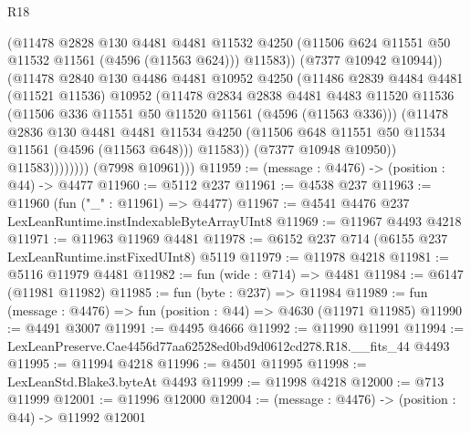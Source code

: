 \begin{lexlean}{R18}
\begin{coremodule}
                          (@11478
                            @2828
                            @130
                            @4481
                            @4481
                            @11532
                            @4250
                            (@11506 @624 @11551 @50 @11532 @11561 (@4596 (@11563 @624)))
                            @11583))
                        (@7377 @10942 @10944))
                      (@11478
                        @2840
                        @130
                        @4486
                        @4481
                        @10952
                        @4250
                        (@11486
                          @2839
                          @4484
                          @4481
                          (@11521 @11536)
                          @10952
                          (@11478
                            @2834
                            @2838
                            @4481
                            @4483
                            @11520
                            @11536
                            (@11506 @336 @11551 @50 @11520 @11561 (@4596 (@11563 @336)))
                            (@11478
                              @2836
                              @130
                              @4481
                              @4481
                              @11534
                              @4250
                              (@11506 @648 @11551 @50 @11534 @11561 (@4596 (@11563 @648)))
                              @11583))
                          (@7377 @10948 @10950))
                        @11583))))))))
        (@7998 @10961)))
@11959 := (message : @4476) -> (position : @44) -> @4477
@11960 := @5112 @237
@11961 := @4538 @237
@11963 := @11960 (fun ("_" : @11961) => @4477)
@11967 := @4541 @4476 @237 LexLeanRuntime.instIndexableByteArrayUInt8
@11969 := @11967 @4493 @4218
@11971 := @11963 @11969 @4481
@11978 := @6152 @237 @714 (@6155 @237 LexLeanRuntime.instFixedUInt8) @5119
@11979 := @11978 @4218
@11981 := @5116 @11979 @4481
@11982 := fun (wide : @714) => @4481
@11984 := @6147 (@11981 @11982)
@11985 := fun (byte : @237) => @11984
@11989 := fun (message : @4476) => fun (position : @44) => @4630 (@11971 @11985)
@11990 := @4491 @3007
@11991 := @4495 @4666
@11992 := @11990 @11991
@11994 := LexLeanPreserve.Cae4456d77aa62528ed0bd9d0612cd278.R18.__fits_44 @4493
@11995 := @11994 @4218
@11996 := @4501 @11995
@11998 := LexLeanStd.Blake3.byteAt @4493
@11999 := @11998 @4218
@12000 := @713 @11999
@12001 := @11996 @12000
@12004 := (message : @4476) -> (position : @44) -> @11992 @12001

\end{coremodule}
\end{lexlean}
